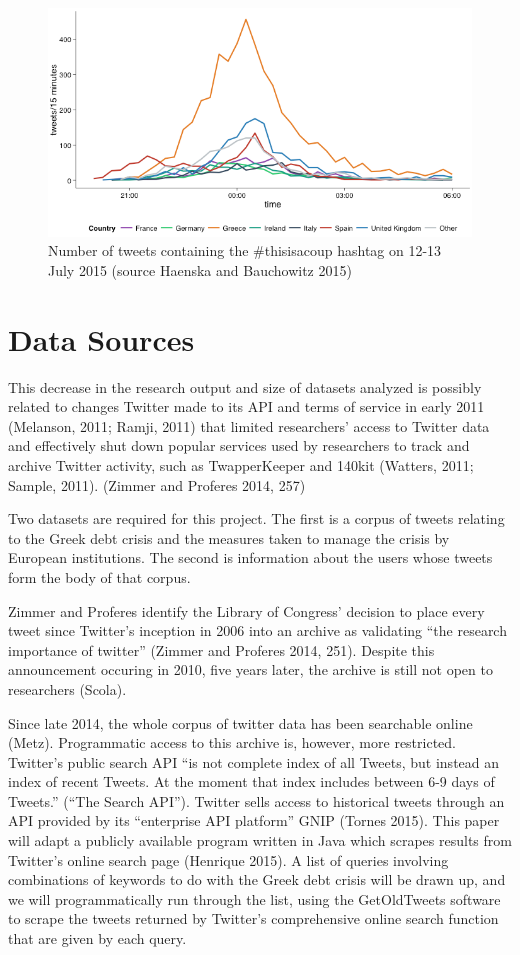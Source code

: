 \documentclass[]{article}
\begin{document}
\begin{figure}[htbp]
\centering
\includegraphics{img/Greece-twitter-2.png}
\caption{Number of tweets containing the \#thisisacoup hashtag on 12-13
July 2015 (source Haenska and Bauchowitz 2015)}
\end{figure}

\section{Data Sources}\label{data-sources}

This decrease in the research output and size of datasets analyzed is
possibly related to changes Twitter made to its API and terms of service
in early 2011 (Melanson, 2011; Ramji, 2011) that limited researchers'
access to Twitter data and effectively shut down popular services used
by researchers to track and archive Twitter activity, such as
TwapperKeeper and 140kit (Watters, 2011; Sample, 2011). (Zimmer and
Proferes 2014, 257)

Two datasets are required for this project. The first is a corpus of
tweets relating to the Greek debt crisis and the measures taken to
manage the crisis by European institutions. The second is information
about the users whose tweets form the body of that corpus.

Zimmer and Proferes identify the Library of Congress' decision to place
every tweet since Twitter's inception in 2006 into an archive as
validating ``the research importance of twitter'' (Zimmer and Proferes
2014, 251). Despite this announcement occuring in 2010, five years
later, the archive is still not open to researchers (Scola).

Since late 2014, the whole corpus of twitter data has been searchable
online (Metz). Programmatic access to this archive is, however, more
restricted. Twitter's public search API ``is not complete index of all
Tweets, but instead an index of recent Tweets. At the moment that index
includes between 6-9 days of Tweets.'' (``The Search API''). Twitter
sells access to historical tweets through an API provided by its
``enterprise API platform'' GNIP (Tornes 2015). This paper will adapt a
publicly available program written in Java which scrapes results from
Twitter's online search page (Henrique 2015). A list of queries
involving combinations of keywords to do with the Greek debt crisis will
be drawn up, and we will programmatically run through the list, using
the GetOldTweets software to scrape the tweets returned by Twitter's
comprehensive online search function that are given by each query.
\end{document}
